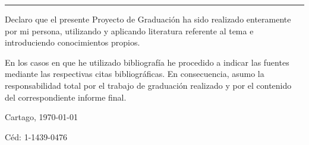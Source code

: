 \thispagestyle{empty}

\rule{10mm}{0pt}

\vfill

Declaro que el presente Proyecto de Graduación ha sido realizado enteramente
por mi persona, utilizando y aplicando literatura referente al tema e
introduciendo conocimientos propios.

En los casos en que he utilizado bibliografía he procedido a indicar las
fuentes mediante las respectivas citas bibliográficas.  En consecuencia,
asumo la responsabilidad total por el trabajo de graduación realizado y por
el contenido del correspondiente informe final.



\vspace*{8mm}

\begin{flushright}
  \scriptAuthor\par
  Cartago, \today\par
  Céd: 1-1439-0476
\end{flushright}

\cleardoublepage


